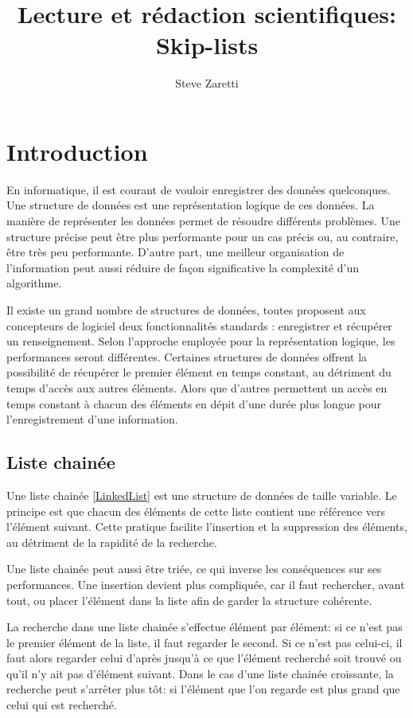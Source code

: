 \documentclass[hidelinks,a4paper, 12pt]{article}
\title{Lecture et rédaction scientifiques: \\Skip-lists }
\author{Steve Zaretti}
\begin{document}
	
	\maketitle
	\newpage
	\tableofcontents
	\newpage
	
	\section{Introduction}
	En informatique, il est courant de vouloir enregistrer des données quelconques. Une structure de données est une représentation logique de ces données. La manière de représenter les données permet de résoudre différents problèmes. Une structure précise peut être plus performante pour un cas précis ou, au contraire, être très peu performante. D’autre part, une meilleur organisation de l'information peut aussi réduire de façon significative la complexité d’un algorithme.
	
	Il existe un grand nombre de structures de données, toutes proposent aux concepteurs de logiciel deux fonctionnalités standards : enregistrer et récupérer un renseignement. Selon l’approche employée pour la représentation logique, les performances seront différentes. Certaines structures de données offrent la possibilité de récupérer le premier élément en temps constant, au détriment du temps d’accès aux autres éléments. Alors que d’autres permettent un accès en temps constant à chacun des éléments en dépit d’une durée plus longue pour l’enregistrement d'une information.
	
	\subsection{Liste chainée}
	Une liste chainée \cref{LinkedList} est une structure de données de taille variable. Le principe est que chacun des éléments de cette liste contient une référence vers l'élément suivant. Cette pratique facilite l'insertion et la suppression des éléments, au détriment de la rapidité de la recherche.
	
	Une liste chainée peut aussi être triée, ce qui inverse les conséquences sur ses performances. Une insertion devient plus compliquée, car il faut rechercher, avant tout, ou placer l'élément dans la liste afin de garder la structure cohérente.
	
	La recherche dans une liste chainée s'effectue élément par élément: si ce n'est pas le premier élément de la liste, il faut regarder le second. Si ce n'est pas celui-ci, il faut alors regarder celui d'après jusqu'à ce que l'élément recherché soit trouvé ou qu'il n'y ait pas d'élément suivant. Dans le cas d'une liste chainée croissante, la recherche peut s'arrêter plus tôt: si l'élément que l'on regarde est plus grand que celui qui est recherché.
	
\end{document}
